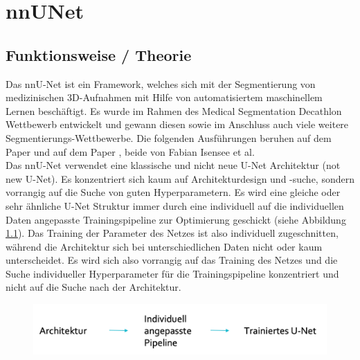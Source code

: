 \chapter{nnUNet}
\label{ch:nnunet}


\section{Funktionsweise / Theorie}



Das nnU-Net ist ein Framework, welches sich mit der Segmentierung von medizinischen 3D-Aufnahmen mit Hilfe von automatisiertem maschinellem Lernen beschäftigt. Es wurde im Rahmen des Medical Segmentation Decathlon Wettbewerb entwickelt und gewann diesen sowie im Anschluss auch viele weitere Segmentierungs-Wettbewerbe. Die folgenden Ausführungen beruhen auf dem Paper \cite{nnunetPaper} und auf dem Paper \cite{nnunetPaperB} , beide von Fabian Isensee et al. \\
Das nnU-Net verwendet eine klassische und nicht neue U-Net Architektur (not new U-Net). Es konzentriert sich kaum auf  Architekturdesign und -suche, sondern vorrangig auf die Suche von guten Hyperparametern. Es wird eine gleiche oder sehr ähnliche U-Net Struktur immer durch eine individuell auf die individuellen Daten angepasste Trainingspipeline zur Optimierung geschickt (siehe Abbildung \ref{pic:nnUnet_Basisschema}). Das Training der Parameter des Netzes ist also individuell zugeschnitten, während die Architektur sich bei unterschiedlichen Daten nicht oder kaum unterscheidet. Es wird sich also vorrangig auf das Training des Netzes und die Suche individueller Hyperparameter für die Trainingspipeline konzentriert und nicht auf die Suche nach der Architektur. 

\begin{figure}[H]
	
	\centering
	\includegraphics[scale=0.3]{Pictures/nnUnet/Bild01.png}
	\caption{}
	\label{pic:nnUnet_Basisschema}
\end{figure}




